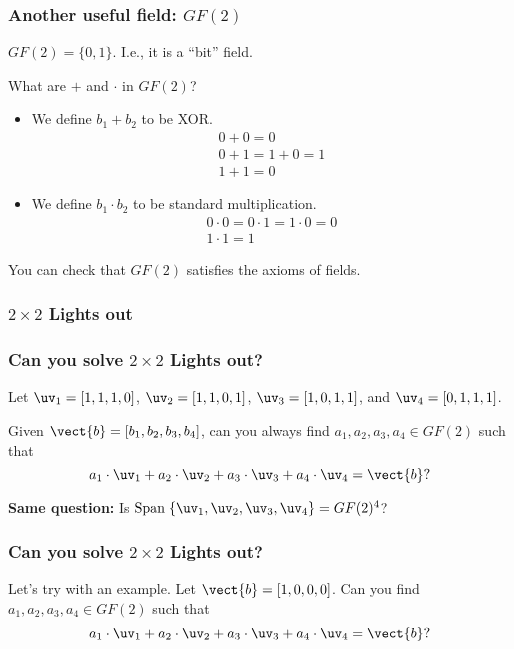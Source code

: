 \begin{frame}
  \frametitle{Another useful field: $GF(2)$}
  $GF(2) = \{0,1\}$.  I.e., it is a ``bit'' field.

  What are $+$ and $\cdot$ in $GF(2)$?

  \pause

  \begin{itemize}
  \item We define $b_1+b_2$ to be XOR.
    \[
    \begin{array}{c}
      0 + 0 = 0 \\ 
      0 + 1 = 1 + 0 = 1 \\ 
      1 + 1 = 0
    \end{array}
    \] \pause
  \item We define $b_1\cdot b_2$ to be standard multiplication.
    \[
    \begin{array}{c}
      0 \cdot 0 = 0\cdot 1 = 1\cdot 0 = 0 \\
      1\cdot 1 = 1
    \end{array}
    \] 
    
  \end{itemize}

  You can check that $GF(2)$ satisfies the axioms of fields.
\end{frame}

\begin{frame}
  \frametitle{$2\times 2$ Lights out}
\end{frame}

\begin{frame}
  \frametitle{Can you solve $2\times 2$ Lights out?}

  Let
  $\uv_1=[1,1,1,0]$, 
  $\uv_2=[1,1,0,1]$, 
  $\uv_3=[1,0,1,1]$, and 
  $\uv_4=[0,1,1,1]$.

  \vspace{0.2in}
  
  Given $\vect{b}=[b_1,b_2,b_3,b_4]$, can you always find
  $a_1,a_2,a_3,a_4\in GF(2)$ such that
  \[
  a_1\cdot \uv_1 + 
  a_2\cdot \uv_2 + 
  a_3\cdot \uv_3 + 
  a_4\cdot \uv_4 = \vect{b} ?
  \]

  \pause

  \vspace{0.2in}

  {\bf Same question:} Is $\mathrm{Span}\;\{\uv_1,\uv_2,\uv_3,\uv_4\} = GF(2)^4$?
\end{frame}


\begin{frame}
  \frametitle{Can you solve $2\times 2$ Lights out?}

  Let's try with an example.  Let $\vect{b}=[1,0,0,0]$.  Can you find
  $a_1,a_2,a_3,a_4\in GF(2)$ such that
  \[
  a_1\cdot \uv_1 + 
  a_2\cdot \uv_2 + 
  a_3\cdot \uv_3 + 
  a_4\cdot \uv_4 = \vect{b} ?
  \]

  \vspace{2in}

\end{frame}


